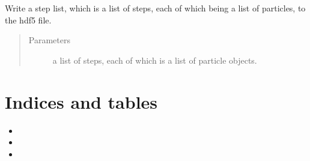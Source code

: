 \documentclass[letterpaper,10pt,english]{sphinxmanual}
\begin{document}
\begin{fulllineitems}
\begin{fulllineitems}
\label{\detokenize{source_code:smcpy.hdf5.hdf5_storage.HDF5Storage.write_step_list}}
Write a step list, which is a list of steps, each of which being a
list of particles, to the hdf5 file.
\begin{quote}\begin{description}
\item[{Parameters}] \leavevmode
{} \textendash{} a list of steps, each of which is a list of
particle objects.

\end{description}\end{quote}

\end{fulllineitems}


\end{fulllineitems}



\chapter{Indices and tables}
\label{\detokenize{index:indices-and-tables}}\begin{itemize}
\item {} 

\item {} 

\item {} 

\end{itemize}
\end{document}
